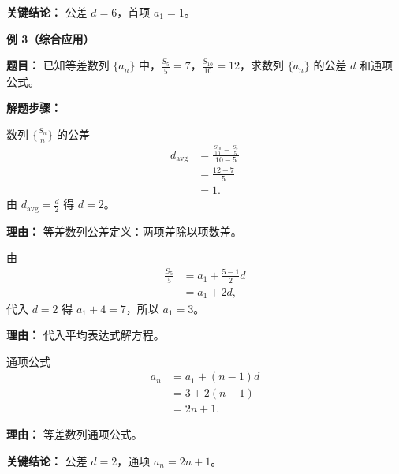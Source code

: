 \begin{examplebox}
	\textbf{\textcolor{CExample}{关键结论：}}
	公差 $d=6$，首项 $a_1=1$。

	\medskip
	\textbf{\textcolor{CExample}{例 3（综合应用）}}

	\textbf{\textcolor{CExample}{题目：}}
	已知等差数列 $\{a_n\}$ 中，$\frac{S_5}{5} = 7$，$\frac{S_{10}}{10} = 12$，求数列 $\{a_n\}$ 的公差 $d$ 和通项公式。

	\textbf{\textcolor{CExample}{解题步骤：}}
	\begin{description}[style=nextline, leftmargin=2.8em, labelsep=0.5em, itemsep=0.45em]
		\item[\textbf{第一步（求平均公差）：}] 数列 $\{\frac{S_n}{n}\}$ 的公差
			\[
				\begin{aligned}
					d_{\text{avg}} &= \frac{\frac{S_{10}}{10} - \frac{S_5}{5}}{10-5} \\
					&= \frac{12-7}{5} \\
					&= 1.
			\end{aligned}
			\]
			由 $d_{\text{avg}} = \frac{d}{2}$ 得 $d=2$。
			\par\textbf{理由：} 等差数列公差定义：两项差除以项数差。
		\item[\textbf{第二步（求首项）：}] 由
			\[
				\begin{aligned}
					\frac{S_5}{5} &= a_1 + \frac{5-1}{2}d \\
					&= a_1 + 2d,
			\end{aligned}
			\]
			代入 $d=2$ 得 $a_1 + 4 = 7$，所以 $a_1=3$。
			\par\textbf{理由：} 代入平均表达式解方程。
		\item[\textbf{第三步（写通项）：}] 通项公式
			\[
				\begin{aligned}
					a_n &= a_1 + (n-1)d \\
					&= 3 + 2(n-1) \\
					&= 2n+1.
			\end{aligned}
			\]
			\par\textbf{理由：} 等差数列通项公式。
	\end{description}

	\textbf{\textcolor{CExample}{关键结论：}}
	公差 $d=2$，通项 $a_n = 2n+1$。
\end{examplebox}
